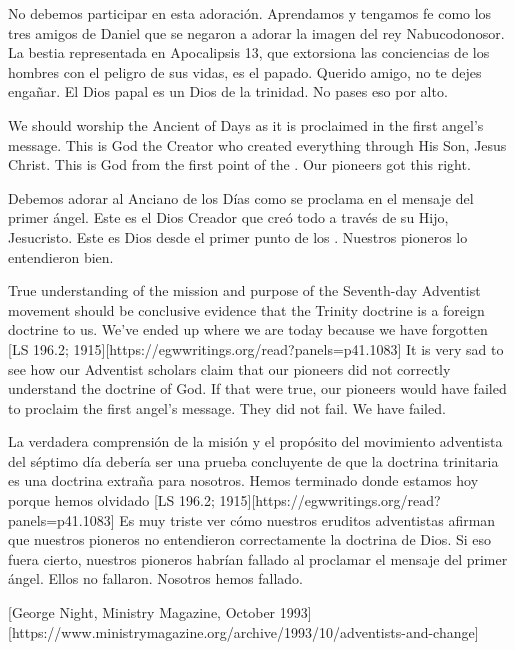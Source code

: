 No debemos participar en esta adoración. Aprendamos y tengamos fe como los tres amigos de Daniel que se negaron a adorar la imagen del rey Nabucodonosor. La bestia representada en Apocalipsis 13, que extorsiona las conciencias de los hombres con el peligro de sus vidas, es el papado. Querido amigo, no te dejes engañar. El Dios papal es un Dios de la trinidad. No pases eso por alto.


We should worship the Ancient of Days as it is proclaimed in the first angel’s message. This is God the Creator who created everything through His Son, Jesus Christ. This is God from the first point of the . Our pioneers got this right.


Debemos adorar al Anciano de los Días como se proclama en el mensaje del primer ángel. Este es el Dios Creador que creó todo a través de su Hijo, Jesucristo. Este es Dios desde el primer punto de los . Nuestros pioneros lo entendieron bien.


True understanding of the mission and purpose of the Seventh-day Adventist movement should be conclusive evidence that the Trinity doctrine is a foreign doctrine to us. We’ve ended up where we are today because we have forgotten [LS 196.2; 1915][https://egwwritings.org/read?panels=p41.1083] It is very sad to see how our Adventist scholars claim that our pioneers did not correctly understand the doctrine of God. If that were true, our pioneers would have failed to proclaim the first angel's message. They did not fail. We have failed.


La verdadera comprensión de la misión y el propósito del movimiento adventista del séptimo día debería ser una prueba concluyente de que la doctrina trinitaria es una doctrina extraña para nosotros. Hemos terminado donde estamos hoy porque hemos olvidado [LS 196.2; 1915][https://egwwritings.org/read?panels=p41.1083] Es muy triste ver cómo nuestros eruditos adventistas afirman que nuestros pioneros no entendieron correctamente la doctrina de Dios. Si eso fuera cierto, nuestros pioneros habrían fallado al proclamar el mensaje del primer ángel. Ellos no fallaron. Nosotros hemos fallado.


[George Night, Ministry Magazine, October 1993][https://www.ministrymagazine.org/archive/1993/10/adventists-and-change]


